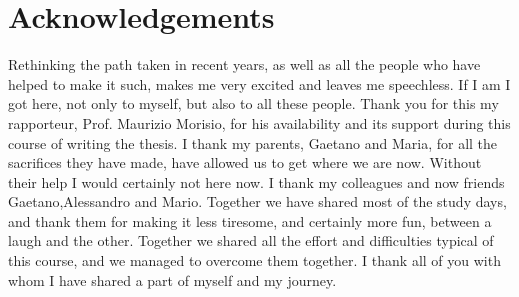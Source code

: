 \newpage
\section*{Acknowledgements}

Rethinking the path taken in recent years, as well as all the people who have
helped to make it such, makes me very excited and leaves me speechless. If I am
I got here, not only to myself, but also to all these people.
Thank you for this my rapporteur, Prof. Maurizio Morisio, for his
availability and its support during this course of writing the thesis.
I thank my parents, Gaetano and Maria, for all the sacrifices they have made,
have allowed us to get where we are now. Without their help I would certainly not
here now.
I thank my colleagues and now friends Gaetano,Alessandro and Mario. Together we have
shared most of the study days, and thank them for making it less
tiresome, and certainly more fun, between a laugh and the other. Together we shared
all the effort and difficulties typical of this course, and we managed to overcome them together.
I thank all of you with whom I have shared a part of myself and my journey.